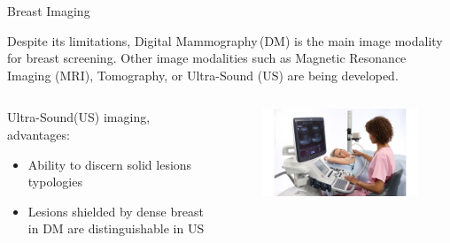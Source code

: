 \begin{frame}{Breast Imaging}

    Despite its limitations, Digital Mammography\,(DM) is the main image modality for breast screening. Other image modalities such as Magnetic Resonance Imaging (MRI), Tomography, or Ultra-Sound (US) are being developed. 

    \begin{columns}
      \begin{column}{.6\textwidth}
        \begin{block}{\small Ultra-Sound(US) imaging, advantages:}\footnotesize
          \begin{itemize}
            \item Ability to discern solid lesions typologies
            \item Lesions shielded by dense breast in DM are distinguishable in US
          \end{itemize}
        \end{block}
      \end{column}
      \begin{column}{.4\textwidth}
        \begin{figure}%
          \centering
          \includegraphics[width=\textwidth]{US_adquisition.jpg}%
        \end{figure}
      \end{column}
    \end{columns}
\end{frame}


